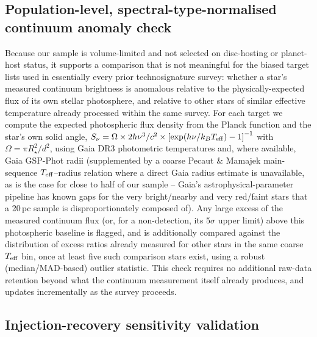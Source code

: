 \documentclass{openjournal}
\begin{document}
\subsection{Population-level, spectral-type-normalised continuum anomaly check}
\label{sec:popanomaly}

Because our sample is volume-limited and not selected on disc-hosting or
planet-host status, it supports a comparison that is not meaningful for
the biased target lists used in essentially every prior technosignature
survey: whether a star's measured continuum brightness is anomalous
relative to the physically-expected flux of its own stellar photosphere,
and relative to other stars of similar effective temperature already
processed within the same survey. For each target we compute the
expected photospheric flux density from the Planck function and the
star's own solid angle,
$S_\nu = \Omega \times 2h\nu^3/c^2 \times \left[\exp(h\nu/k_BT_{\rm eff}) - 1\right]^{-1}$
with $\Omega = \pi R_\star^2/d^2$, using Gaia DR3 photometric
temperatures and, where available, Gaia GSP-Phot radii (supplemented by a
coarse Pecaut \& Mamajek main-sequence $T_{\rm eff}$--radius relation
where a direct Gaia radius estimate is unavailable, as is the case for
close to half of our sample -- Gaia's astrophysical-parameter pipeline
has known gaps for the very bright/nearby and very red/faint stars that
a 20\,pc sample is disproportionately composed of). Any large excess of
the measured continuum flux (or, for a non-detection, its $5\sigma$ upper
limit) above this photospheric baseline is flagged, and is additionally
compared against the distribution of excess ratios already measured for
other stars in the same coarse $T_{\rm eff}$ bin, once at least five such
comparison stars exist, using a robust (median/MAD-based) outlier
statistic. This check requires no additional raw-data retention beyond
what the continuum measurement itself already produces, and updates
incrementally as the survey proceeds.

\subsection{Injection-recovery sensitivity validation}
\label{sec:injectrecovery}
\end{document}
